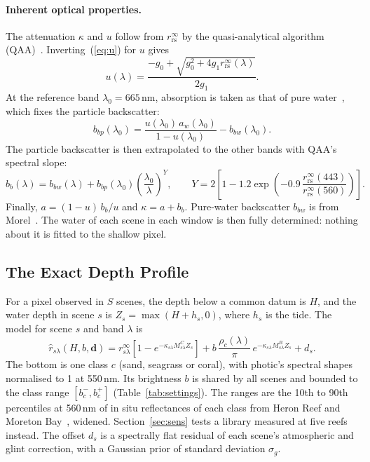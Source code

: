 \documentclass[remotesensing,article,submit,pdftex]{Definitions/mdpi}
\begin{document}
\paragraph{Inherent optical properties.} The attenuation $\kappa$ and $u$ follow from $r_\mathrm{rs}^\infty$ by the quasi-analytical algorithm (QAA)~\cite{lee2002qaa}. Inverting~(\ref{eq:u}) for $u$ gives
\begin{equation}
u(\lambda) = \frac{-g_0 + \sqrt{g_0^2 + 4 g_1 r_\mathrm{rs}^\infty(\lambda)}}{2 g_1}.
\end{equation}
At the reference band $\lambda_0 = 665$\,nm, absorption is taken as that of pure water~\cite{pope1997}, which fixes the particle backscatter:
\begin{equation}
b_{bp}(\lambda_0) = \frac{u(\lambda_0)\,a_w(\lambda_0)}{1 - u(\lambda_0)} - b_{bw}(\lambda_0).
\end{equation}
The particle backscatter is then extrapolated to the other bands with QAA's spectral slope:
\begin{equation}
b_b(\lambda) = b_{bw}(\lambda) + b_{bp}(\lambda_0)\left(\frac{\lambda_0}{\lambda}\right)^{Y}, \qquad Y = 2\left[1 - 1.2\exp\left(-0.9\,\frac{r_\mathrm{rs}^\infty(443)}{r_\mathrm{rs}^\infty(560)}\right)\right].
\end{equation}
Finally, $a = (1 - u)\,b_b/u$ and $\kappa = a + b_b$. Pure-water backscatter $b_{bw}$ is from Morel~\cite{morel1974}. The water of each scene in each window is then fully determined: nothing about it is fitted to the shallow pixel.

\subsection{The Exact Depth Profile}\label{sec:profile}

For a pixel observed in $S$ scenes, the depth below a common datum is $H$, and the water depth in scene $s$ is $Z_s = \max(H + h_s, 0)$, where $h_s$ is the tide. The model for scene $s$ and band $\lambda$ is
\begin{equation}
\hat r_{s\lambda}(H, b, \mathbf{d}) = r^\infty_{s\lambda}\left[1 - e^{-\kappa_{s\lambda} M^C_{s\lambda} Z_s}\right] + b\,\frac{\rho_c(\lambda)}{\pi}\,e^{-\kappa_{s\lambda} M^B_{s\lambda} Z_s} + d_s. \label{eq:model}
\end{equation}
The bottom is one class $c$ (sand, seagrass or coral), with photic's spectral shapes~\cite{blake2020} normalised to 1 at 550\,nm. Its brightness $b$ is shared by all scenes and bounded to the class range $[b_c^-, b_c^+]$ (Table~\ref{tab:settings}). The ranges are the 10th to 90th percentiles at 560\,nm of in situ reflectances of each class from Heron Reef and Moreton Bay~\cite{roelfsema2012,roelfsema2016}, widened. Section~\ref{sec:sens} tests a library measured at five reefs instead. The offset $d_s$ is a spectrally flat residual of each scene's atmospheric and glint correction, with a Gaussian prior of standard deviation $\sigma_g$.
\end{document}
